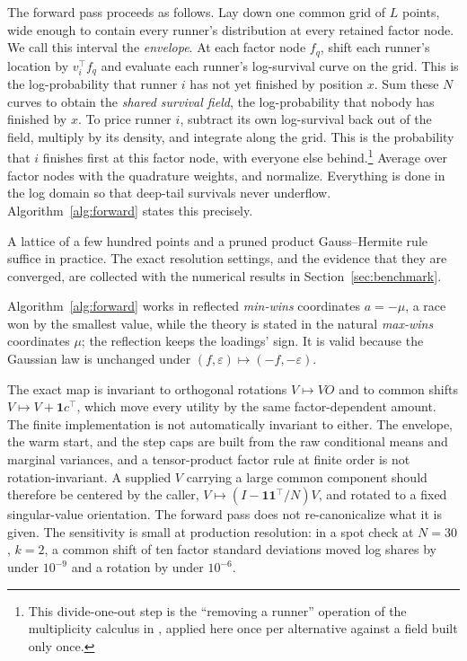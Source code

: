 \documentclass[12pt]{article}
\theoremstyle{remark}
\begin{document}
The forward pass proceeds as follows. Lay down one common
grid of $L$ points, wide enough to contain every runner's distribution
at every retained factor node. We call this interval the
\emph{envelope}. At each factor node $f_q$, shift each
runner's location by $v_i^\top f_q$ and evaluate each runner's
log-survival curve on the grid. This is the log-probability that runner
$i$ has not yet finished by position $x$. Sum these $N$ curves to obtain the
\emph{shared survival field}, the log-probability that nobody has
finished by $x$. To price runner $i$, subtract its own log-survival
back out of the field, multiply by its density, and integrate along the
grid. This is the probability that $i$ finishes first at this factor
node, with everyone else behind.\footnote{This divide-one-out step is
the ``removing a runner'' operation of the multiplicity calculus in
\citet{cotton2021}, applied here once per alternative against a field
built only once.} Average over factor nodes with the
quadrature weights, and normalize. Everything is done in the log domain
so that deep-tail survivals never underflow. Algorithm~\ref{alg:forward}
states this precisely.

A lattice of a few hundred points and a pruned product Gauss--Hermite
rule suffice in practice. The exact resolution settings, and the
evidence that they are converged, are collected with the numerical
results in Section~\ref{sec:benchmark}.

Algorithm~\ref{alg:forward} works in reflected \emph{min-wins}
coordinates $a = -\mu$, a race won by the smallest value, while the
theory is stated in the natural \emph{max-wins} coordinates $\mu$; the reflection
keeps the loadings' sign. It is valid
because the Gaussian law is unchanged under $(f, \varepsilon) \mapsto
(-f, -\varepsilon)$.

The exact map is invariant to orthogonal rotations $V \mapsto VO$ and
to common shifts $V \mapsto V + \mathbf{1}c^\top$, which move every
utility by the same factor-dependent amount. The finite implementation
is not automatically invariant to either. The envelope, the warm
start, and the step caps are built from the raw conditional means and
marginal variances, and a tensor-product factor rule at finite order is
not rotation-invariant. A supplied $V$ carrying a large common
component should therefore be centered by the caller, $V \mapsto (I -
\mathbf{1}\mathbf{1}^\top/N)V$, and rotated to a fixed singular-value
orientation. The forward pass does not re-canonicalize what it is
given. The sensitivity is small at production resolution: in a spot
check at $N = 30$, $k = 2$, a common shift of ten factor standard
deviations moved log shares by under $10^{-9}$ and a rotation by under
$10^{-6}$.
\end{document}
